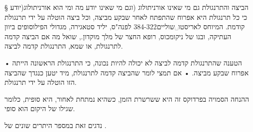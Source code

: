 § הביצה והתרנגולת
גם מי שאינו אורניתולוג (וגם מי שאינו יודע מה ומי הוא אורניתולוג(יודע כי כל
תרנגולת היא אפרוח שהתפתח לאחר שבקע מביצה, וכל ביצה הוטלה על ידי תרנגולת קודמת.
 המיוחס
לאריסטו␣שוליים{384-322 לפנה"ס, יליד סטאגירה, מגדולי הפילוסופים ביוון
העתיקה, ובנו של ניקומכוס, רופא החצר של מלך מוקדון.}, שואל מה אם הביצה קדמה
לתרנגולת, או שמא, התרנגולת קדמה לביצה.
\begin{itemize}

• הטענה שהתרנגולת קדמה לביצה לא יכולה להיות נכונה, כי התרנגולת הראשונה הייתה
אפרוח שבקע מביצה. • אם תמצי לומר שהביצה קדמה לתרנגולת, מיד יטען כנגדך שהביצה
הזו הוטלה על ידי תרנגולת.

ההנחה הסמויה בפרדוקס זה היא ששרשרת הזמן, כשהיא נמתחת לאחור, היא סופית, כלומר
שגילו של היקום הוא סופי.

\end{itemize}
נדגים זאת במספר היתרים שונים של .
